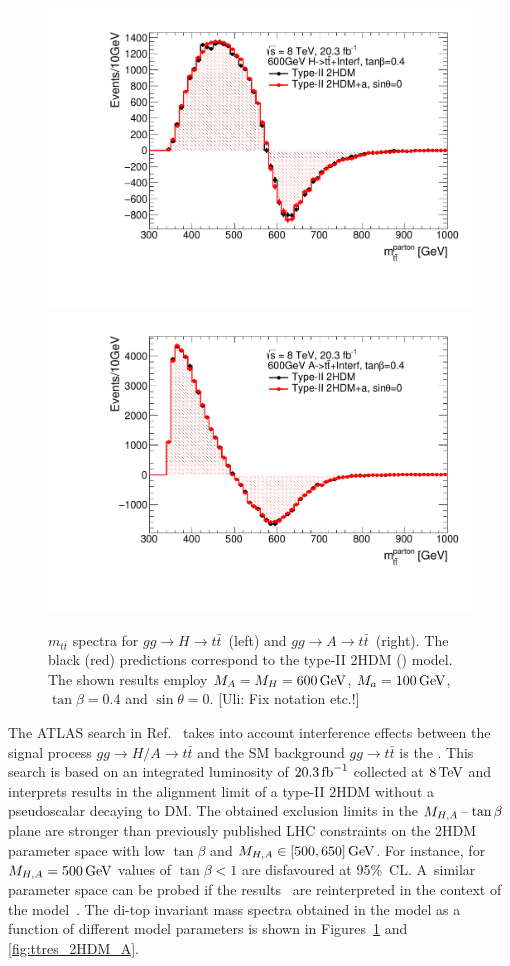 \begin{figure}
\centering
\includegraphics[width=.48\textwidth]{texinputs/04_grid/figures/ttres/ttres_2HDMvs2HDMa_H.pdf} \quad 
\includegraphics[width=.48\textwidth]{texinputs/04_grid/figures/ttres/ttres_2HDMvs2HDMa_A.pdf}
\caption{$m_{t \bar t}$ spectra for $gg \to H \to t \bar t$~(left) and  $gg \to A \to t \bar t$~(right). The black (red) predictions correspond to the type-II 2HDM (\hdma) model.  The shown results employ $M_{A}=M_{H}=600 \, {\rm GeV}$,  $M_{a}=100 \, {\rm GeV}$, $\tan \beta =0.4$ and $\sin \theta = 0$.  {\color{red} [Uli: Fix notation etc.!]}}
\label{fig:ttres_2HDMvs2HDMa}
\end{figure}

The ATLAS search in Ref.~\cite{Aaboud:2017hnm} takes into account interference effects between the signal process $gg \to H/A \to t \bar t$ and the SM background $gg \to t \bar t$ is the . This search is based on an integrated luminosity of $20.3 \, {\rm fb}^{-1}$ collected at $8 \, {\rm TeV}$ and interprets results in the alignment limit of a type-II 2HDM without a pseudoscalar decaying to DM. The obtained  exclusion limits in the $M_{H,A}\hspace{0.5mm}$--$\hspace{0.5mm} \tan \beta$ plane are stronger than previously published LHC constraints on the 2HDM parameter space with low $\tan \beta$ and $M_{H,A} \in [500, 650] \, {\rm GeV}$. For instance,  for $M_{H,A} = 500 \, {\rm GeV}$ values of $\tan \beta < 1$ are disfavoured at 95\%~CL. A~similar parameter space  can be probed if the results~\cite{Aaboud:2017hnm} are reinterpreted in the context of the \hdma model~\cite{Bauer:2017ota}. The di-top invariant mass spectra obtained in the \hdma model as a function of different model parameters is shown in Figures~\ref{fig:ttres_2HDMvs2HDMa} and \ref{fig:ttres_2HDM_A}. 


